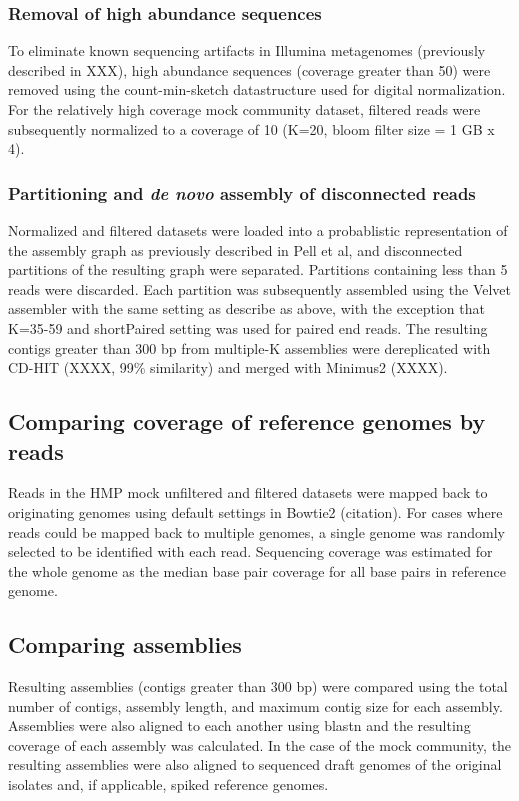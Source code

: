 \documentclass[11pt]{article} %
\begin{document}
\subsubsection{Removal of high abundance sequences}
To eliminate known sequencing artifacts in Illumina metagenomes (previously described in XXX), high abundance sequences (coverage greater than 50) were removed using the count-min-sketch datastructure used for digital normalization.  For the relatively high coverage mock community dataset, filtered reads were subsequently normalized to a coverage of 10 (K=20, bloom filter size = 1 GB x 4).  

\subsubsection{Partitioning and \emph{de novo} assembly of disconnected reads}
Normalized and filtered datasets were loaded into a probablistic representation of the assembly graph as previously described in Pell et al, and disconnected partitions of the resulting graph were separated.  Partitions containing less than 5 reads were discarded.  Each partition was subsequently assembled using the Velvet assembler with the same setting as describe as above, with the exception that K=35-59 and shortPaired setting was used for paired end reads.  The resulting contigs greater than 300 bp from multiple-K assemblies were dereplicated with CD-HIT (XXXX, 99\% similarity) and merged with Minimus2 (XXXX).  

\subsection{Comparing coverage of reference genomes by reads}
Reads in the HMP mock unfiltered and filtered datasets were mapped back to originating genomes using default settings in Bowtie2 (citation).  For cases where reads could be mapped back to multiple genomes, a single genome was randomly selected to be identified with each read.  Sequencing coverage was estimated for the whole genome as the median base pair coverage for all base pairs in reference genome.  

\subsection{Comparing assemblies}
Resulting assemblies (contigs greater than 300 bp) were compared using the total number of contigs, assembly length, and maximum contig size for each assembly.  Assemblies were also aligned to each another using blastn and the resulting coverage of each assembly was calculated.  In the case of the mock community, the resulting assemblies were also aligned to sequenced draft genomes of the original isolates and, if applicable, spiked reference genomes.
\end{document}
